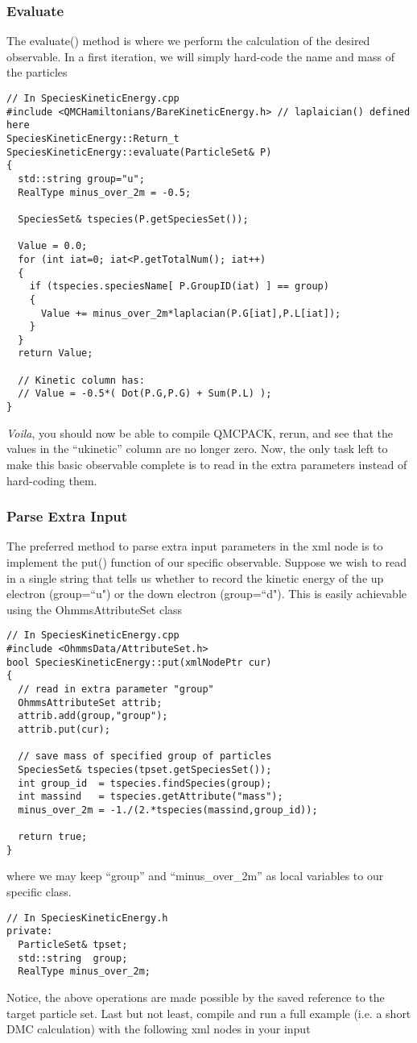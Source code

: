 \documentclass[aps,prl,preprint]{revtex4-1}
\begin{document}
\subsubsection{Evaluate}
The evaluate() method is where we perform the calculation of the desired observable. In a first iteration, we will simply hard-code the name and mass of the particles
\begin{lstlisting}
// In SpeciesKineticEnergy.cpp
#include <QMCHamiltonians/BareKineticEnergy.h> // laplaician() defined here
SpeciesKineticEnergy::Return_t SpeciesKineticEnergy::evaluate(ParticleSet& P)
{
  std::string group="u";
  RealType minus_over_2m = -0.5;
  
  SpeciesSet& tspecies(P.getSpeciesSet());
  
  Value = 0.0;
  for (int iat=0; iat<P.getTotalNum(); iat++)
  {
    if (tspecies.speciesName[ P.GroupID(iat) ] == group)
    {
      Value += minus_over_2m*laplacian(P.G[iat],P.L[iat]);
    }
  }
  return Value;
  
  // Kinetic column has:
  // Value = -0.5*( Dot(P.G,P.G) + Sum(P.L) );
}
\end{lstlisting}
\textit{Voila}, you should now be able to compile QMCPACK, rerun, and see that the values in the ``ukinetic'' column are no longer zero. Now, the only task left to make this basic observable complete is to read in the extra parameters instead of hard-coding them.

\subsubsection{Parse Extra Input}
The preferred method to parse extra input parameters in the xml node is to implement the put() function of our specific observable. Suppose we wish to read in a single string that tells us whether to record the kinetic energy of the up electron (group=``u") or the down electron (group=``d"). This is easily achievable using the OhmmsAttributeSet class
\begin{lstlisting}
// In SpeciesKineticEnergy.cpp
#include <OhmmsData/AttributeSet.h>
bool SpeciesKineticEnergy::put(xmlNodePtr cur)
{ 
  // read in extra parameter "group"
  OhmmsAttributeSet attrib;
  attrib.add(group,"group");
  attrib.put(cur);
  
  // save mass of specified group of particles
  SpeciesSet& tspecies(tpset.getSpeciesSet());
  int group_id  = tspecies.findSpecies(group);
  int massind   = tspecies.getAttribute("mass");
  minus_over_2m = -1./(2.*tspecies(massind,group_id));
  
  return true;
}
\end{lstlisting}
where we may keep ``group'' and ``minus\_over\_2m'' as local variables to our specific class.
\begin{lstlisting}
// In SpeciesKineticEnergy.h
private:
  ParticleSet& tpset;
  std::string  group;
  RealType minus_over_2m;
\end{lstlisting}
Notice, the above operations are made possible by the saved reference to the target particle set. Last but not least, compile and run a full example (i.e. a short DMC calculation) with the following xml nodes in your input
\end{document}
